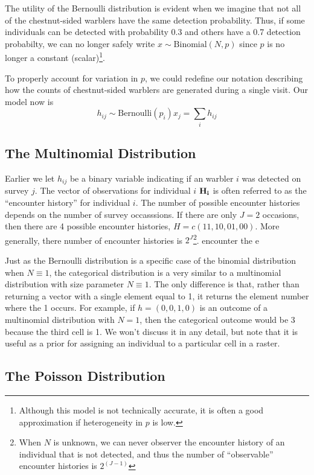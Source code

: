 The utility of the Bernoulli distribution is evident when we imagine
that not all of the chestnut-sided warblers have the same detection
probability. Thus, if some individuals can be detected with
probability 0.3 and others have a 0.7 detection probabilty, we can no
longer safely write $x \sim \text{Binomial}(N, p)$ since $p$ is no
longer a constant (scalar)\footnote{Although this model is not
  technically accurate, it is often a good approximation if
  heterogeneity in $p$ is low.}.

To properly account for variation in $p$, we could redefine our notation
describing how the counts of chestnut-sided warblers are generated during a
single visit. Our model now is
\[
h_{ij} \sim \text{Bernoulli}(p_i)
x_j = \sum_i h_{ij}
\]


\subsection{The Multinomial Distribution}


Earlier we let $h_{ij}$ be a binary variable indicating if an
warbler $i$ was detected on survey $j$. The vector of observations for
individual $i$ $\bf H_i$ is often referred to as the ``encounter
history'' for individual $i$. The number of possible encounter
histories depends on the number of survey occasssions. If there are
only $J=2$ occasions, then there are 4 possible encounter histories, $H = c(11, 10,
01, 00)$. More generally, there number of encounter histories is
$2^J$\footnote{When $N$ is unknown, we can never observer the
  encounter history of an individual that is not detected, and thus
  the number of ``observable'' encounter histories is $2^(J-1)$}.
encounter
the e

Just as the Bernoulli distribution is a specific case of the binomial
distribution when $N\equiv1$, the categorical distribution is a very
similar to a multinomial distribution with size parameter
$N\equiv1$. The only difference is that, rather than returning a
vector with a single element equal to 1, it returns the element number
where the 1 occurs. For example, if $h=(0,0,1,0)$ is an outcome of a
multinomial distribution with $N=1$, then the categorical outcome
would be 3 because the third cell is 1. We
won't discuss it in any detail, but note that it is useful as a prior
for assigning an individual to a particular cell in a raster.


\subsection{The Poisson Distribution}

